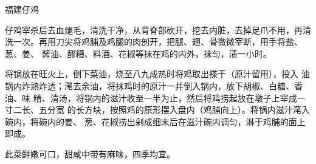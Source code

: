 %
%
%
%
%
%
%
\begin{recipe}{福建仔鸡}

\ingredients


\preparation

\step 仔鸡宰杀后去血煺毛，清洗干净，从背脊部砍开，挖去内脏，去掉足爪不用，再清
洗一次。再用刀尖将鸡脯及鸡腿的肉剖开，把腿、翅、骨微微宰断，用手将盐、葱、姜、
酱油、醪糟、料酒、花椒等抹在鸡的内外，抹匀，渍一小时。

\step 将锅放在旺火上，倒下菜油，烧至八九成热时将鸡取出搽干（原汁留用），投入
油锅内炸熟炸透；滗去余油，将抹鸡时的原汁一并倒入锅内，放下胡椒、白糖、香油、味
精、清汤，将锅内的滋汁收至一半为止，然后将鸡捞起放在墩子上宰成一寸二长、五分宽
的长方块，按照鸡的原形摆入盘内（鸡脯向上）。将锅内滋汁滗入碗内，将碗内的姜、
葱、花椒捞出剁成细末后在滋汁碗内调匀，淋于鸡脯的面上即成。

\features

此菜鲜嫩可口，甜咸中带有麻味，四季均宜。

\end{recipe}


